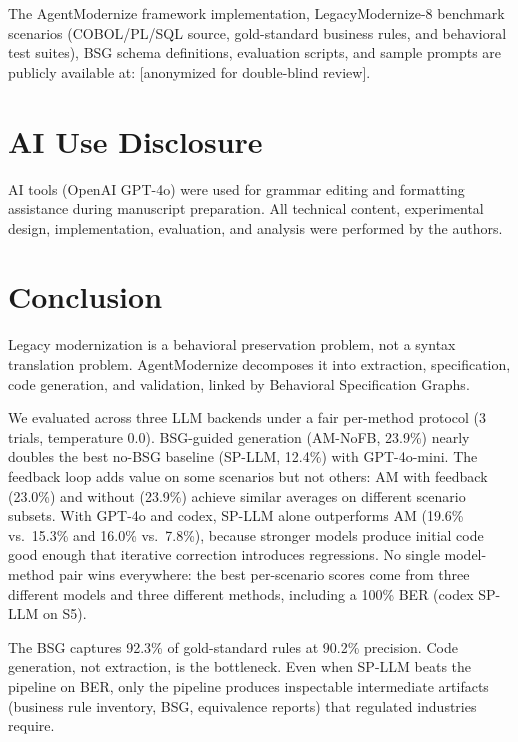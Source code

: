 \documentclass[conference]{IEEEtran}
\begin{document}
The AgentModernize framework implementation, LegacyModernize-8 benchmark scenarios (COBOL/PL/SQL source, gold-standard business rules, and behavioral test suites), BSG schema definitions, evaluation scripts, and sample prompts are publicly available at: [anonymized for double-blind review].

\section{AI Use Disclosure}

AI tools (OpenAI GPT-4o) were used for grammar editing and formatting assistance during manuscript preparation. All technical content, experimental design, implementation, evaluation, and analysis were performed by the authors.

\section{Conclusion}

Legacy modernization is a behavioral preservation problem, not a syntax translation problem. AgentModernize decomposes it into extraction, specification, code generation, and validation, linked by Behavioral Specification Graphs.

We evaluated across three LLM backends under a fair per-method protocol (3 trials, temperature 0.0). BSG-guided generation (AM-NoFB, 23.9\%) nearly doubles the best no-BSG baseline (SP-LLM, 12.4\%) with GPT-4o-mini. The feedback loop adds value on some scenarios but not others: AM with feedback (23.0\%) and without (23.9\%) achieve similar averages on different scenario subsets. With GPT-4o and codex, SP-LLM alone outperforms AM (19.6\% vs.\ 15.3\% and 16.0\% vs.\ 7.8\%), because stronger models produce initial code good enough that iterative correction introduces regressions. No single model-method pair wins everywhere: the best per-scenario scores come from three different models and three different methods, including a 100\% BER (codex SP-LLM on S5).

The BSG captures 92.3\% of gold-standard rules at 90.2\% precision. Code generation, not extraction, is the bottleneck. Even when SP-LLM beats the pipeline on BER, only the pipeline produces inspectable intermediate artifacts (business rule inventory, BSG, equivalence reports) that regulated industries require.
\end{document}
